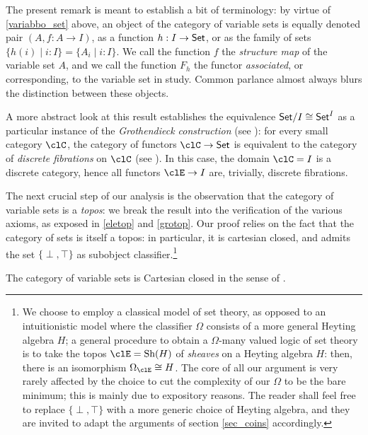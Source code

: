 \begin{notation}
  The present remark is meant to establish a bit of terminology: by virtue of \autoref{variabbo_set} above, an object of the category of variable sets is equally denoted pair $(A,f : A \to I)$, as a function $h : I \to \mathsf{Set}$, or as the family of sets $\{h(i) \mid i : I\} = \{A_i\mid i: I\}$. We call the function $f$ the \emph{structure map} of the variable set $A$, and we call the function $F_h$ the functor \emph{associated}, or corresponding, to the variable set in study. Common parlance almost always blurs the distinction between these objects.
\end{notation}
\begin{remark}
  A more abstract look at this result establishes the equivalence $\mathsf{Set}/I\cong \mathsf{Set}^I$ as a particular instance of the \emph{Grothendieck construction} (see \cite[1.1]{Leinster2004}): for every small category $\clC$, the category of functors $\clC\to\Set$ is equivalent to the category of \emph{discrete fibrations} on $\clC$ (see \cite[1.1]{Leinster2004}). In this case, the domain $\clC=I$ is a discrete category, hence all functors $\clE \to I$ are, trivially, discrete fibrations.
\end{remark}
\begin{remark}
  The next crucial step of our analysis is the observation that the category of variable sets is a \emph{topos}: we break the result into the verification of the various axioms, as exposed in \autoref{eletop} and \autoref{grotop}. Our proof relies on the fact that the category of sets is itself a topos: in particular, it is cartesian closed, and admits the set $\{\perp,\top\}$ as subobject classifier.\footnote{We choose to employ a classical model of set theory, as opposed to an intuitionistic model where the classifier $\Omega$ consists of a more general Heyting algebra $H$; a general procedure to obtain a $\Omega$-many valued logic of set theory is to take the topos $\clE = \text{Sh}(H)$ of \emph{sheaves} on a Heyting algebra $H$: then, there is an isomorphism $\Omega_\clE\cong H$. The core of all our argument is very rarely affected by the choice to cut the complexity of our $\Omega$ to be the bare minimum; this is mainly due to expository reasons. The reader shall feel free to replace $\{\perp,\top\}$ with a more generic choice of Heyting algebra, and they are invited to adapt the arguments of section \autoref{sec_coins} accordingly.}
\end{remark}
\begin{proposition}\label{carclo}
  The category of variable sets is Cartesian closed in the sense of \cite[p.335]{Bor1}.
\end{proposition}
